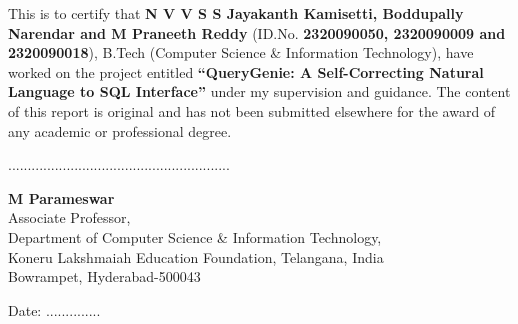 \begin{doublespace}

This is to certify that \textbf{N V V S S Jayakanth Kamisetti, Boddupally Narendar and M Praneeth Reddy} (ID.No. \textbf{2320090050, 2320090009 and 2320090018}), B.Tech (Computer Science \& Information Technology), have worked on the project entitled \textbf{``QueryGenie: A Self-Correcting Natural Language to SQL Interface''} under my supervision and guidance. The content of this report is original and has not been submitted elsewhere for the award of any academic or professional degree.

\end{doublespace}


\par \null \par \par \null \par \par \null \par \par \null \par
\begin{flushleft}
.........................................................\\
\par\null\par
\textbf{M Parameswar}\\
Associate Professor,\\
Department of Computer Science \& Information Technology,\\
Koneru Lakshmaiah Education Foundation, Telangana, India\\
Bowrampet, Hyderabad-500043\\

\end{flushleft}
\par \null \par \par \null \par
Date: ..............
